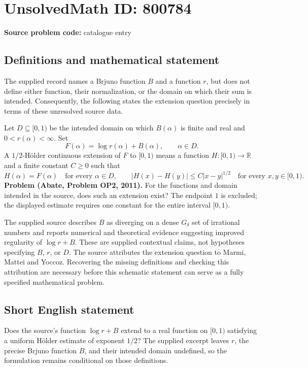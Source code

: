 \documentclass[11pt]{article}
\newcommand{\R}{\mathbb{R}}
\begin{document}
\section*{UnsolvedMath ID: 800784}
\textbf{Source problem code:} catalogue entry
\subsection{Definitions and mathematical statement}
The supplied record names a Brjuno function \(B\) and a function \(r\), but does not define either function, their normalization, or the domain on which their sum is intended. Consequently, the following states the extension question precisely in terms of these unresolved source data.

Let \(D\subseteq[0,1)\) be the intended domain on which \(B(\alpha)\) is finite and real and \(0<r(\alpha)<\infty\). Set
\[
F(\alpha)=\log r(\alpha)+B(\alpha),\qquad \alpha\in D.
\]
A \(1/2\)-H\"older continuous extension of \(F\) to \([0,1)\) means a function \(H:[0,1)\to\R\) and a finite constant \(C\geq0\) such that
\[
H(\alpha)=F(\alpha)\quad\text{for every }\alpha\in D,
\qquad
|H(x)-H(y)|\leq C|x-y|^{1/2}
\quad\text{for every }x,y\in[0,1).
\]
\textbf{Problem (Abate, Problem OP2, 2011).} For the functions and domain intended in the source, does such an extension exist? The endpoint \(1\) is excluded; the displayed estimate requires one constant for the entire interval \([0,1)\).

The supplied source describes \(B\) as diverging on a dense \(G_\delta\) set of irrational numbers and reports numerical and theoretical evidence suggesting improved regularity of \(\log r+B\). These are supplied contextual claims, not hypotheses specifying \(B\), \(r\), or \(D\). The source attributes the extension question to Marmi, Mattei and Yoccoz. Recovering the missing definitions and checking this attribution are necessary before this schematic statement can serve as a fully specified mathematical problem.
\subsection{Short English statement}
Does the source's function \(\log r+B\) extend to a real function on \([0,1)\) satisfying a uniform H\"older estimate of exponent \(1/2\)? The supplied excerpt leaves \(r\), the precise Brjuno function \(B\), and their intended domain undefined, so the formulation remains conditional on those definitions.
\end{document}
